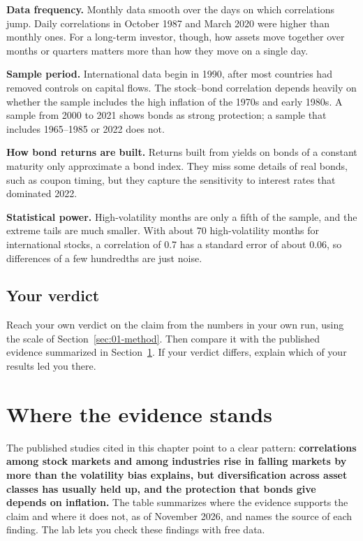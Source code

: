 \textbf{Data frequency.} Monthly data smooth over the days on which correlations jump. Daily correlations in October 1987 and March 2020 were higher than monthly ones. For a long-term investor, though, how assets move together over months or quarters matters more than how they move on a single day.

\textbf{Sample period.} International data begin in 1990, after most countries had removed controls on capital flows. The stock--bond correlation depends heavily on whether the sample includes the high inflation of the 1970s and early 1980s. A sample from 2000 to 2021 shows bonds as strong protection; a sample that includes 1965--1985 or 2022 does not.

\textbf{How bond returns are built.} Returns built from yields on bonds of a constant maturity only approximate a bond index. They miss some details of real bonds, such as coupon timing, but they capture the sensitivity to interest rates that dominated 2022.

\textbf{Statistical power.} High-volatility months are only a fifth of the sample, and the extreme tails are much smaller. With about 70 high-volatility months for international stocks, a correlation of 0.7 has a standard error of about 0.06, so differences of a few hundredths are just noise.

\subsection*{Your verdict}

Reach your own verdict on the claim from the numbers in your own run, using the scale of Section~\ref{sec:01-method}. Then compare it with the published evidence summarized in Section~\ref{sec:13-verdict}. If your verdict differs, explain which of your results led you there.

\section{Where the evidence stands}
\label{sec:13-verdict}

The published studies cited in this chapter point to a clear pattern: \textbf{correlations among stock markets and among industries rise in falling markets by more than the volatility bias explains, but diversification across asset classes has usually held up, and the protection that bonds give depends on inflation.} The table summarizes where the evidence supports the claim and where it does not, as of November 2026, and names the source of each finding. The lab lets you check these findings with free data.


